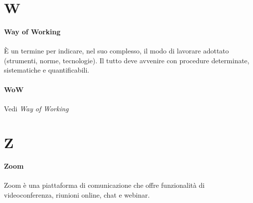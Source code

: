 \documentclass[10pt, a4paper]{article}
\begin{document}
\newpage
\section{W}

\vspace{2em}
\paragraph{Way of Working}\noindent\hrulefill
\paragraph{}È un termine per indicare, nel suo complesso, il modo di lavorare adottato (strumenti, norme, tecnologie). Il tutto deve avvenire con procedure determinate, sistematiche e quantificabili.   

\vspace{2em}
\paragraph{WoW}\noindent\hrulefill
\paragraph{}Vedi \textit{Way of Working\pg}

\newpage
\section{Z}
\vspace{2em}
\paragraph{Zoom}\noindent\hrulefill
\paragraph{}Zoom è una piattaforma di comunicazione che offre funzionalità di videoconferenza, riunioni online, chat e webinar.
\end{document}
